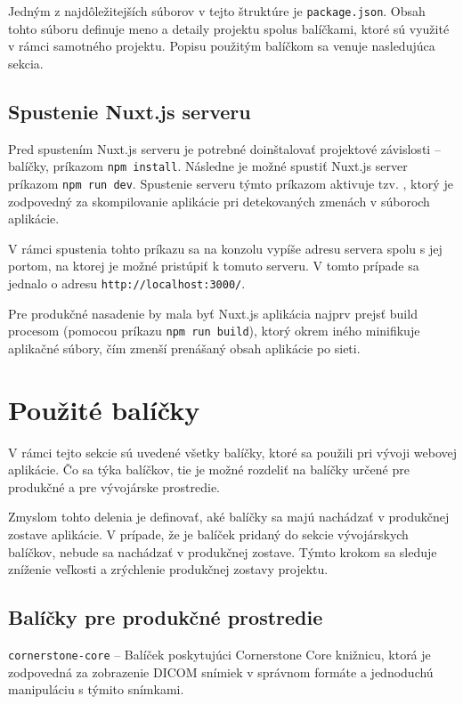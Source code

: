 Jedným z najdôležitejších súborov v tejto štruktúre je \texttt{package.json}. Obsah tohto súboru definuje meno a detaily projektu spolu\newline s balíčkami, ktoré sú využité v rámci samotného projektu. Popisu použitým balíčkom sa venuje nasledujúca sekcia.

\subsection {Spustenie Nuxt.js serveru}
Pred spustením Nuxt.js serveru je potrebné doinštalovať projektové závislosti -- balíčky, príkazom \texttt{npm install}. Následne je možné spustiť Nuxt.js server príkazom \texttt{npm run dev}. Spustenie serveru týmto príkazom aktivuje tzv. , ktorý je zodpovedný za skompilovanie aplikácie pri detekovaných zmenách v súboroch aplikácie.

\clearpage

V rámci spustenia tohto príkazu sa na konzolu vypíše adresu servera spolu s jej portom, na ktorej je možné pristúpiť k tomuto serveru. V tomto prípade sa jednalo o adresu \texttt{http://localhost:3000/}. 

Pre produkčné nasadenie by mala byť Nuxt.js aplikácia najprv prejsť build procesom (pomocou príkazu \texttt{npm run build}), ktorý okrem iného minifikuje aplikačné súbory, čím zmenší prenášaný obsah aplikácie po sieti.

\section {Použité balíčky}
V rámci tejto sekcie sú uvedené všetky balíčky, ktoré sa použili pri vývoji webovej aplikácie.
Čo sa týka balíčkov, tie je možné rozdeliť na balíčky určené pre produkčné a pre vývojárske prostredie.

Zmyslom tohto delenia je definovať, aké balíčky sa majú nachádzať v produkčnej zostave aplikácie. V prípade, že je balíček pridaný do sekcie vývojárskych balíčkov, nebude sa nachádzať v produkčnej zostave. Týmto krokom sa sleduje zníženie veľkosti a zrýchlenie produkčnej zostavy projektu.

\subsection {Balíčky pre produkčné prostredie}
\texttt{cornerstone-core} -- Balíček poskytujúci Cornerstone Core knižnicu, ktorá je zodpovedná za zobrazenie DICOM snímiek v správnom formáte a jednoduchú manipuláciu s týmito snímkami.

